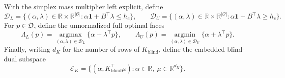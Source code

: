 With the simplex mass multiplier left explicit, define
\[
\mathcal D_L=\{(\alpha,\lambda)\in\mathbb R\times\mathbb R^{|\mathcal O|}:\alpha\mathbf 1+B^{\top}\lambda\leq h_e\},
\qquad
\mathcal D_U=\{(\alpha,\lambda)\in\mathbb R\times\mathbb R^{|\mathcal O|}:\alpha\mathbf 1+B^{\top}\lambda\geq h_e\}.
\]
For \(p\in\mathfrak O\), define the unnormalized full optimal faces
\[
\Lambda_L(p)=\operatorname*{argmax}_{(\alpha,\lambda)\in\mathcal D_L}
\{\alpha+\lambda^{\top}p\},
\qquad
\Lambda_U(p)=\operatorname*{argmin}_{(\alpha,\lambda)\in\mathcal D_U}
\{\alpha+\lambda^{\top}p\}.
\]
Finally, writing \(d_K\) for the number of rows of \(K_{\mathrm{blind}}\), define the embedded blind-dual subspace
\[
\mathcal E_K=\{(\alpha,K_{\mathrm{blind}}^{\top}\mu):
\alpha\in\mathbb R,\ \mu\in\mathbb R^{d_K}\}.
\]